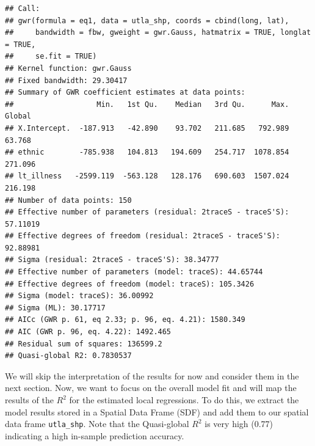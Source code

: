 \documentclass[
]{book}
\begin{document}
\begin{verbatim}
## Call:
## gwr(formula = eq1, data = utla_shp, coords = cbind(long, lat), 
##     bandwidth = fbw, gweight = gwr.Gauss, hatmatrix = TRUE, longlat = TRUE, 
##     se.fit = TRUE)
## Kernel function: gwr.Gauss 
## Fixed bandwidth: 29.30417 
## Summary of GWR coefficient estimates at data points:
##                   Min.   1st Qu.    Median   3rd Qu.      Max.  Global
## X.Intercept.  -187.913   -42.890    93.702   211.685   792.989  63.768
## ethnic        -785.938   104.813   194.609   254.717  1078.854 271.096
## lt_illness   -2599.119  -563.128   128.176   690.603  1507.024 216.198
## Number of data points: 150 
## Effective number of parameters (residual: 2traceS - traceS'S): 57.11019 
## Effective degrees of freedom (residual: 2traceS - traceS'S): 92.88981 
## Sigma (residual: 2traceS - traceS'S): 38.34777 
## Effective number of parameters (model: traceS): 44.65744 
## Effective degrees of freedom (model: traceS): 105.3426 
## Sigma (model: traceS): 36.00992 
## Sigma (ML): 30.17717 
## AICc (GWR p. 61, eq 2.33; p. 96, eq. 4.21): 1580.349 
## AIC (GWR p. 96, eq. 4.22): 1492.465 
## Residual sum of squares: 136599.2 
## Quasi-global R2: 0.7830537
\end{verbatim}

We will skip the interpretation of the results for now and consider them in the next section. Now, we want to focus on the overall model fit and will map the results of the \(R^{2}\) for the estimated local regressions. To do this, we extract the model results stored in a Spatial Data Frame (SDF) and add them to our spatial data frame \texttt{utla\_shp}. Note that the Quasi-global \(R^{2}\) is very high (0.77) indicating a high in-sample prediction accuracy.
\end{document}
